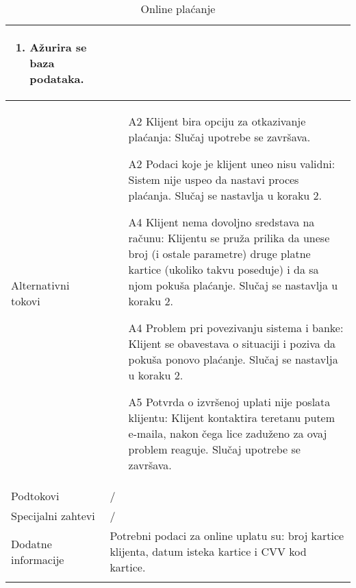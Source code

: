 \documentclass[../main.tex]{subfiles}
\begin{document}
\begin{longtable}{| p{} | p{} |}
\begin{enumerate}
        \item Ažurira se baza podataka.
    \end{enumerate}\\
\hline
    Alternativni tokovi & \begin{enumerate}
       	    \item [A2] Klijent bira opciju za otkazivanje plaćanja: Slučaj upotrebe se završava.
        	\item [A2] Podaci koje je klijent uneo nisu validni: Sistem nije uspeo da nastavi proces plaćanja. Slučaj se nastavlja u koraku 2.
        	\item [A4] Klijent nema dovoljno sredstava na računu: Klijentu se pruža prilika da unese broj (i ostale parametre) druge platne kartice (ukoliko takvu poseduje) i da sa njom pokuša plaćanje. Slučaj se nastavlja u koraku 2. %
        	\item [A4] Problem pri povezivanju sistema i banke: Klijent se obavestava o situaciji i poziva da pokuša ponovo plaćanje. Slučaj se nastavlja u koraku 2.
        	\item [A5] Potvrda o izvršenoj uplati nije poslata klijentu: Klijent kontaktira teretanu putem e-maila, nakon čega lice zaduženo za ovaj problem reaguje. Slučaj upotrebe se završava.
        	\end{enumerate}\\
\hline
    Podtokovi & / \\
\hline
    Specijalni zahtevi & / \\
\hline
    Dodatne informacije & Potrebni podaci za online uplatu su: broj kartice klijenta, datum isteka kartice i CVV kod kartice. \\
\hline
\caption{Online plaćanje} %
\label{tab:myfirstlongtable}
\end{longtable}

\end{document}

